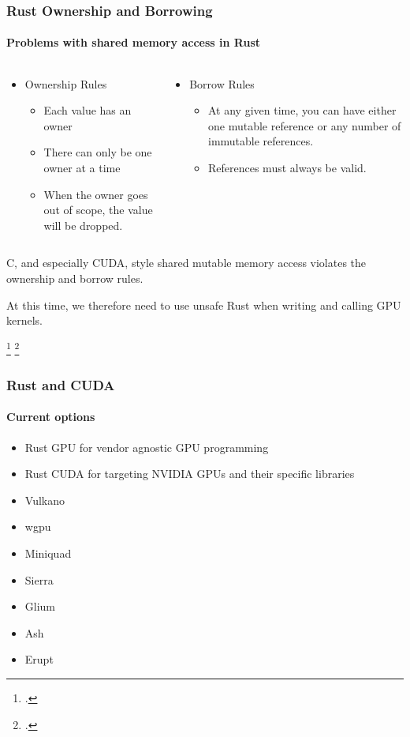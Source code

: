 \documentclass[aspectratio=169]{beamer}
\begin{document}
\begin{frame}
	\frametitle{Rust Ownership and Borrowing}
	\framesubtitle{Problems with shared memory access in Rust}

	\begin{columns}
		\begin{column}{0.5\textwidth}
			\begin{itemize}
				\item Ownership Rules\footnotemark
				      \begin{itemize}
					      \item Each value has an owner
					      \item There can only be one owner at a time
					      \item When the owner goes out of scope, the value will be dropped.
				      \end{itemize}
			\end{itemize}
		\end{column}
		\begin{column}{0.5\textwidth}
			\begin{itemize}
				\item Borrow Rules\footnotemark
				      \begin{itemize}
					      \item At any given time, you can have either one mutable reference or any number of immutable references.
					      \item References must always be valid.
				      \end{itemize}
			\end{itemize}
		\end{column}
	\end{columns}

	\vspace{1cm}
	C, and especially CUDA, style shared mutable memory access violates the ownership and borrow rules.

	At this time, we therefore need to use unsafe Rust when writing and calling GPU kernels.

	\footcitetext[Ch04-01]{rust-book}
	\footcitetext[Ch04-02]{rust-book}
\end{frame}

\begin{frame}
	\frametitle{Rust and CUDA}
	\framesubtitle{Current options}

	\begin{itemize}
		\item Rust GPU for vendor agnostic GPU programming
		\item Rust CUDA for targeting NVIDIA GPUs and their specific libraries
		\item Vulkano
		\item wgpu
		\item Miniquad
		\item Sierra
		\item Glium
		\item Ash
		\item Erupt
	\end{itemize}
\end{frame}
\end{document}
